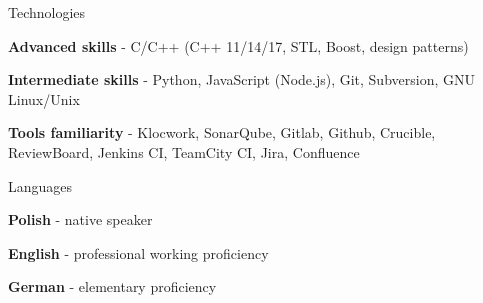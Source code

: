 


\begin{cvskills}

  \cvskill
    {Technologies}
    {
      \begin{cvitems}
        \item {\textbf{Advanced skills} - C/C++ (C++ 11/14/17, STL, Boost, design patterns)}
        \item {\textbf{Intermediate skills} - Python, JavaScript (Node.js), Git, Subversion, GNU Linux/Unix}
        \item {\textbf{Tools familiarity} - Klocwork, SonarQube, Gitlab, Github, Crucible, ReviewBoard, Jenkins CI, TeamCity CI, Jira, Confluence}
      \end{cvitems}
    }


  \cvskill
    {Languages}
    {
      \begin{cvitems}
        \item {\textbf{Polish} - native speaker}
        \item {\textbf{English} - professional working proficiency}
        \item {\textbf{German} - elementary proficiency}
      \end{cvitems}
      }

\end{cvskills}
